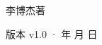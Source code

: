 \begin{titlepage}
\vfill
{\LARGE\sffamily 李博杰\quad 著\par}
\vspace{0.7cm}
{\small\sffamily\color{structurecolor!80} 版本 v1.0 · \number\year 年 \number\month 月 \number\day 日\par}
\vspace{1.2cm}
\end{titlepage}
